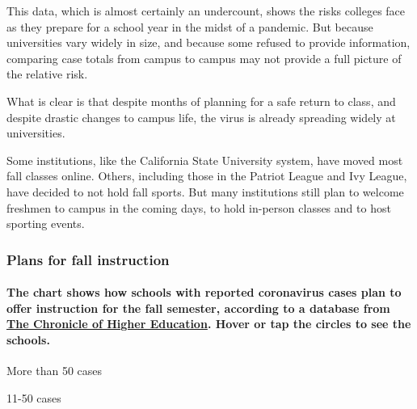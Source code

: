 This data, which is almost certainly an undercount, shows the risks
colleges face as they prepare for a school year in the midst of a
pandemic. But because universities vary widely in size, and because some
refused to provide information, comparing case totals from campus to
campus may not provide a full picture of the relative risk.

What is clear is that despite months of planning for a safe return to
class, and despite drastic changes to campus life, the virus is already
spreading widely at universities.

Some institutions, like the California State University system, have
moved most fall classes online. Others, including those in the Patriot
League and Ivy League, have decided to not hold fall sports. But many
institutions still plan to welcome freshmen to campus in the coming
days, to hold in-person classes and to host sporting events.

\hypertarget{plans-for-fall-instruction}{%
\subsubsection{Plans for fall
instruction}\label{plans-for-fall-instruction}}

\hypertarget{the-chart-shows-how-schools-with-reported-coronavirus-cases-plan-to-offer-instruction-for-the-fall-semester-according-to-a-database-from-the-chronicle-of-higher-education-hover-or-tap-the-circles-to-see-the-schools}{%
\paragraph{\texorpdfstring{The chart shows how schools with reported
coronavirus cases plan to offer instruction for the fall semester,
according to a database from
\href{https://www.chronicle.com/article/Here-s-a-List-of-Colleges-/248626}{The
Chronicle of Higher Education}. Hover or tap the circles to see the
schools.}{The chart shows how schools with reported coronavirus cases plan to offer instruction for the fall semester, according to a database from The Chronicle of Higher Education. Hover or tap the circles to see the schools.}}\label{the-chart-shows-how-schools-with-reported-coronavirus-cases-plan-to-offer-instruction-for-the-fall-semester-according-to-a-database-from-the-chronicle-of-higher-education-hover-or-tap-the-circles-to-see-the-schools}}

More than 50 cases

11-50 cases

